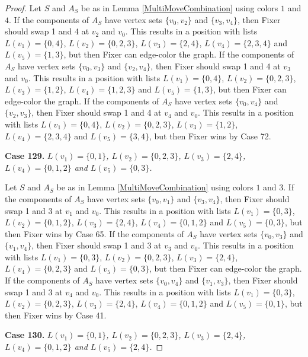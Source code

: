 \documentclass[12pt]{amsart}
\theoremstyle{plain}
\theoremstyle{definition}
\theoremstyle{remark}
\begin{document}
\begin{proof}
Let $S$ and $A_S$ be as in Lemma \ref{MultiMoveCombination} using colors $1$ and $4$. If the components of $A_S$ have vertex sets $\{v_0, v_2\}$ and $\{v_3, v_4\}$, then Fixer should swap 1 and 4 at $v_2$ and $v_0$. This results in a position with lists $L(v_1) = \{0, 4\}$, $L(v_2) = \{0, 2, 3\}$, $L(v_3) = \{2, 4\}$, $L(v_4) = \{2, 3, 4\}$ and $L(v_5) = \{1, 3\}$, but then Fixer can edge-color the graph.
If the components of $A_S$ have vertex sets $\{v_0, v_3\}$ and $\{v_2, v_4\}$, then Fixer should swap 1 and 4 at $v_3$ and $v_0$. This results in a position with lists $L(v_1) = \{0, 4\}$, $L(v_2) = \{0, 2, 3\}$, $L(v_3) = \{1, 2\}$, $L(v_4) = \{1, 2, 3\}$ and $L(v_5) = \{1, 3\}$, but then Fixer can edge-color the graph.
If the components of $A_S$ have vertex sets $\{v_0, v_4\}$ and $\{v_2, v_3\}$, then Fixer should swap 1 and 4 at $v_4$ and $v_0$. This results in a position with lists $L(v_1) = \{0, 4\}$, $L(v_2) = \{0, 2, 3\}$, $L(v_3) = \{1, 2\}$, $L(v_4) = \{2, 3, 4\}$ and $L(v_5) = \{3, 4\}$, but then Fixer wins by Case 72.

\noindent\textbf{Case 129.  }\textit{$L(v_1) = \{0, 1\}$, $L(v_2) = \{0, 2, 3\}$, $L(v_3) = \{2, 4\}$, $L(v_4) = \{0, 1, 2\}$ and $L(v_5) = \{0, 3\}$.}

Let $S$ and $A_S$ be as in Lemma \ref{MultiMoveCombination} using colors $1$ and $3$. If the components of $A_S$ have vertex sets $\{v_0, v_1\}$ and $\{v_3, v_4\}$, then Fixer should swap 1 and 3 at $v_1$ and $v_0$. This results in a position with lists $L(v_1) = \{0, 3\}$, $L(v_2) = \{0, 1, 2\}$, $L(v_3) = \{2, 4\}$, $L(v_4) = \{0, 1, 2\}$ and $L(v_5) = \{0, 3\}$, but then Fixer wins by Case 65.
If the components of $A_S$ have vertex sets $\{v_0, v_3\}$ and $\{v_1, v_4\}$, then Fixer should swap 1 and 3 at $v_3$ and $v_0$. This results in a position with lists $L(v_1) = \{0, 3\}$, $L(v_2) = \{0, 2, 3\}$, $L(v_3) = \{2, 4\}$, $L(v_4) = \{0, 2, 3\}$ and $L(v_5) = \{0, 3\}$, but then Fixer can edge-color the graph.
If the components of $A_S$ have vertex sets $\{v_0, v_4\}$ and $\{v_1, v_3\}$, then Fixer should swap 1 and 3 at $v_4$ and $v_0$. This results in a position with lists $L(v_1) = \{0, 3\}$, $L(v_2) = \{0, 2, 3\}$, $L(v_3) = \{2, 4\}$, $L(v_4) = \{0, 1, 2\}$ and $L(v_5) = \{0, 1\}$, but then Fixer wins by Case 41.

\noindent\textbf{Case 130.  }\textit{$L(v_1) = \{0, 1\}$, $L(v_2) = \{0, 2, 3\}$, $L(v_3) = \{2, 4\}$, $L(v_4) = \{0, 1, 2\}$ and $L(v_5) = \{2, 4\}$.}


\end{proof}
\end{document}

